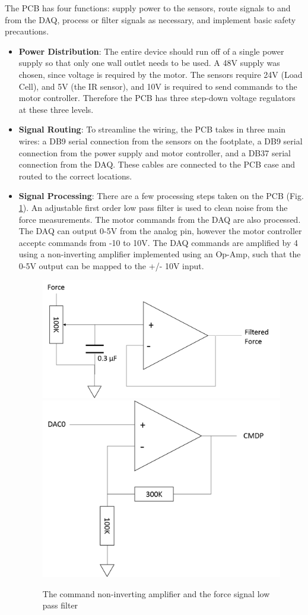 \documentclass[12pt]{report}
\begin{document}
	The PCB has four functions: supply power to the sensors, route signals to and from the DAQ, process or filter signals as necessary, and implement basic safety precautions. 
	\begin{itemize}
	\item \textbf{Power Distribution}: The entire device should run off of a single power supply so that only one wall outlet needs to be used. A 48V supply was chosen, since voltage is required by the motor. The sensors require 24V (Load Cell), and 5V (the IR sensor), and 10V is required to send commands to the motor controller. Therefore the PCB has three step-down voltage regulators at these three levels.
	\item \textbf{Signal Routing}: To streamline the wiring, the PCB takes in three main wires: a DB9 serial connection from the sensors on the footplate, a DB9 serial connection from  the power supply and motor controller, and a DB37 serial connection from the DAQ. These cables are connected to the PCB case and routed to the correct locations.
	\item \textbf{Signal Processing}: There are a few processing steps taken on the PCB (Fig. \ref{fig:amp}). An adjustable first order low pass filter is used to clean noise from the force measurements. The motor commands from the DAQ are also processed. The DAQ can output 0-5V from the analog pin, however the motor controller acceptc commands from -10 to 10V. The DAQ commands are amplified by 4 using a non-inverting amplifier implemented using an Op-Amp, such that the 0-5V output can be mapped to the +/- 10V input. 

	\begin{figure}[h] 
		\centering
		\includegraphics[width=0.4\linewidth]{ft_filter}
		\includegraphics[width=0.4\linewidth]{amplifier}
		\caption{The command non-inverting amplifier and the force signal low pass filter}
		\label{fig:amp}
	\end{figure}	
	

\end{itemize}
\end{document}
